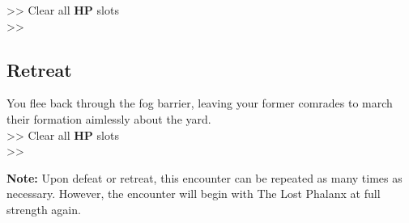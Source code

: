 >> Clear all \textbf{HP} slots\\
>> 

\subsection*{Retreat}
You flee back through the fog barrier, leaving your former comrades to march their formation aimlessly about the yard.\\

>> Clear all \textbf{HP} slots\\
>> \\

\begin{tcolorbox}
\textbf{Note:} Upon defeat or retreat, this encounter can be repeated as many times as necessary. However, the encounter will begin with The Lost Phalanx at full strength again.
\end{tcolorbox}